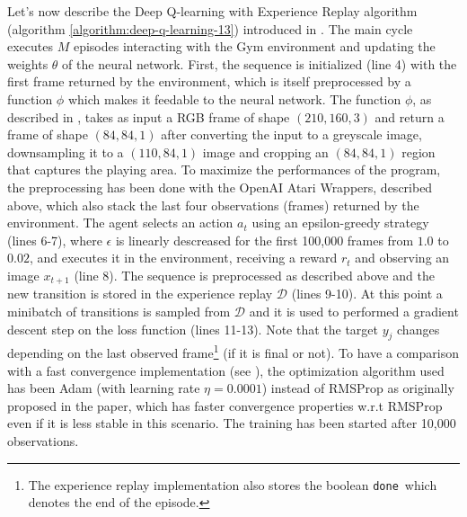\documentclass[a4paper]{article}
\numberwithin{equation}{section} %
\numberwithin{figure}{section} %
\numberwithin{table}{section} %
\theoremstyle{definition}
\begin{document}
Let's now describe the Deep Q-learning with Experience Replay algorithm
(algorithm \ref{algorithm:deep-q-learning-13}) introduced in \cite{mnih2013playing}.
The main cycle executes $M$ episodes interacting with the Gym environment and
updating the weights $\theta$ of the neural network. First, the sequence is
initialized (line 4) with the first frame returned by the environment, which
is itself preprocessed by a function $\phi$ which makes it feedable to the neural
network. The function $\phi$, as described in \cite{mnih2013playing}, takes as
input a RGB frame of shape $(210, 160, 3)$ and return a frame of shape
$(84, 84, 1)$ after converting the input to a greyscale image, downsampling it
to a $(110, 84, 1)$ image and cropping an $(84, 84, 1)$ region that captures
the playing area. To maximize the performances of the program, the preprocessing
has been done with the OpenAI Atari Wrappers\cite{openai-gym-baselines}, described
above, which also stack the last four observations (frames) returned by the environment.
The agent selects an action $a_t$ using an epsilon-greedy strategy (lines 6-7),
where $\epsilon$ is linearly descreased for the first 100,000 frames from $1.0$
to $0.02$, and executes it in the environment, receiving a reward $r_t$ and observing
an image $x_{t+1}$ (line 8). The sequence is preprocessed as described above and
the new transition is stored in the experience replay $\mathcal{D}$ (lines 9-10).
At this point a minibatch of transitions is sampled from $\mathcal{D}$ and it is
used to performed a gradient descent step on the loss function (lines 11-13).
Note that the target $y_j$ changes depending on the last observed
frame\footnote{The experience replay implementation also stores the boolean
\texttt{done}\ which denotes the end of the episode.} (if it is final or not).
To have a comparison with a fast convergence implementation (see \cite{Medium-Pong-30min}),
the optimization algorithm used has been Adam (with learning rate $\eta = 0.0001$)
instead of RMSProp as originally proposed in the paper, which has faster
convergence properties w.r.t RMSProp\cite{Adam-Kingma} even if it is less stable
in this scenario. The training has been started after 10,000 observations.
\end{document}
